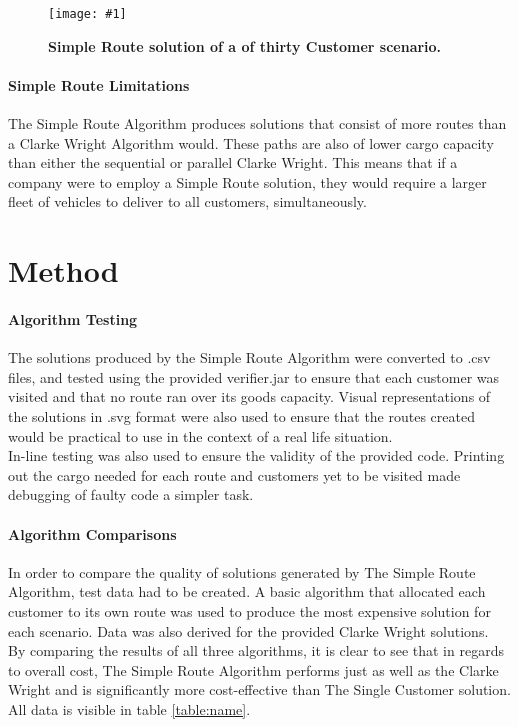 \documentclass[conference]{acmsiggraph}
\newcommand{\figuremacroW}[4]{
	\begin{figure}[h] %
		\centering
		\texttt{[image: \#1]}
		\caption[#2]{\textbf{#2}  #3}
		\label{fig:#1}
	\end{figure}
}
\begin{document}
		\figuremacroW
		{sr30}
		{Simple Route solution of a of thirty Customer scenario.}
		{}
		{0.75}	
		
		\paragraph{Simple Route Limitations}
		The Simple Route Algorithm produces solutions that consist of more routes than a Clarke Wright Algorithm would. These paths are also of lower cargo capacity than either the sequential or parallel Clarke Wright. This means that if a company were to employ a Simple Route solution, they would require a larger fleet of vehicles to deliver to all customers, simultaneously.
		
	\section{Method}
		\paragraph{Algorithm Testing}
		The solutions produced by the Simple Route Algorithm were converted to .csv files, and tested using the provided verifier.jar to ensure that each customer was visited and that no route ran over its goods capacity. Visual representations of the solutions in .svg format were also used to ensure that the routes created would be practical to use in the context of a real life situation.\\
		In-line testing was also used to ensure the validity of the provided code. Printing out the cargo needed for each route and customers yet to be visited made debugging of faulty code a simpler task. 
	
		\paragraph{Algorithm Comparisons}
		In order to compare the quality of solutions generated by The Simple Route Algorithm, test data had to be created. A basic algorithm that allocated each customer to its own route was used to produce the most expensive solution for each scenario. Data was also derived for the provided Clarke Wright solutions.\\
		By comparing the results of all three algorithms, it is clear to see that in regards to overall cost, The Simple Route Algorithm performs just as well as the Clarke Wright and is significantly more cost-effective than The Single Customer solution. All data is visible in table \ref{table:name}.
				
\end{document}

